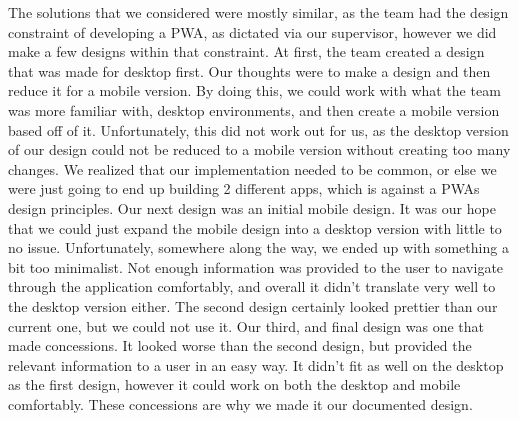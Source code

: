 \documentclass[12pt, titlepage]{article}
\begin{document}
\begin{enumerate}
  The solutions that we considered were mostly similar, as the team had the design constraint of developing a PWA, as dictated via our supervisor, however we did make a few designs within that constraint. At first, the team created a design that was made for desktop first. Our thoughts were to make a design and then reduce it for a mobile version. By doing this, we could work with what the team was more familiar with, desktop environments, and then create a mobile version based off of it. Unfortunately, this did not work out for us, as the desktop version of our design could not be reduced to a mobile version without creating too many changes. We realized that our implementation needed to be common, or else we were just going to end up building 2 different apps, which is against a PWAs design principles. Our next design was an initial mobile design. It was our hope that we could just expand the mobile design into a desktop version with little to no issue. Unfortunately, somewhere along the way, we ended up with something a bit too minimalist. Not enough information was provided to the user to navigate through the application comfortably, and overall it didn't translate very well to the desktop version either. The second design certainly looked prettier than our current one, but we could not use it. Our third, and final design was one that made concessions. It looked worse than the second design, but provided the relevant information to a user in an easy way. It didn't fit as well on the desktop as the first design, however it could work on both the desktop and mobile comfortably. These concessions are why we made it our documented design.
\end{enumerate}
\end{document}
